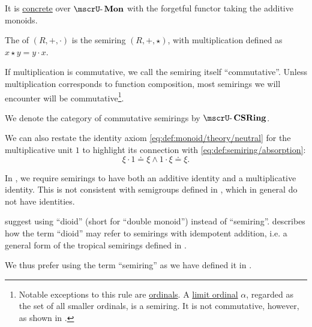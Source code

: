 \begin{definition}
\begin{thmenum}
    It is \hyperref[def:concrete_category]{concrete} over \hyperref[def:monoid/category]{\( \ucat{Mon} \)} with the forgetful functor taking the additive monoids.

     The  of \( (R, +, \cdot) \) is the semiring \( (R, +, \star) \), with multiplication defined as \( x \star y = y \cdot x \).

     If multiplication is commutative, we call the semiring itself \enquote{commutative}. Unless multiplication corresponds to function composition, most semirings we will encounter will be commutative\footnote{
    Notable exceptions to this rule are \hyperref[def:ordinal]{ordinals}. A \hyperref[def:successor_and_limit_ordinal]{limit ordinal} \( \alpha \), regarded as the set of all smaller ordinals, is a semiring. It is not commutative, however, as shown in .}.

    We denote the category of commutative semirings by \( \ucat{CSRing} \).
  \end{thmenum}
\end{definition}
\begin{comments}
  \item We can also restate the identity axiom \eqref{eq:def:monoid/theory/neutral} for the multiplicative unit \( 1 \) to highlight its connection with \eqref{eq:def:semiring/absorption}:
  \begin{equation}\label{eq:def:semiring/identity}
    \xi \cdot 1 \doteq \xi \wedge 1 \cdot \xi \doteq \xi.
  \end{equation}
\end{comments}

\begin{remark}\label{rem:semiring_etymology}
  In , we require semirings to have both an additive identity and a multiplicative identity. This is not consistent with semigroups defined in , which in general do not have identities.

   suggest using \enquote{dioid} (short for \enquote{double monoid}) instead of \enquote{semiring}.  describes how the term \enquote{dioid} may refer to semirings with idempotent addition, i.e. a general form of the tropical semirings defined in .

  We thus prefer using the term \enquote{semiring} as we have defined it in .
\end{remark}

